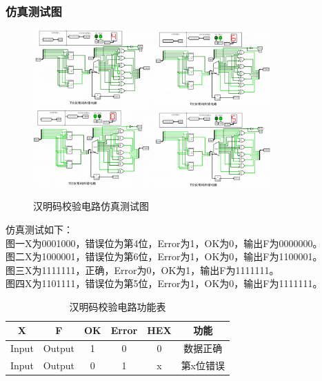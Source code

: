 \documentclass{article}
\begin{document}
    \subsubsection{仿真测试图}
    \begin{figure}[H]
    \centering
    \includegraphics[width=0.4\textwidth]{5.5.1.png}
    \includegraphics[width=0.4\textwidth]{5.5.2.png}
    \includegraphics[width=0.4\textwidth]{5.5.3.png}
    \includegraphics[width=0.4\textwidth]{5.5.4.png}
    \caption{汉明码校验电路仿真测试图}
    \end{figure}
    仿真测试如下：\\
    图一X为0001000，错误位为第4位，Error为1，OK为0，输出F为0000000。\\
    图二X为1000001，错误位为第6位，Error为1，OK为0，输出F为1100001。\\
    图三X为1111111，正确，Error为0，OK为1，输出F为1111111。\\
    图四X为1101111，错误位为第5位，Error为1，OK为0，输出F为1111111。

    \begin{table}[H]
    \centering
    \begin{tabular}{|c|c|c|c|c|c|}
        \hline
        X & F & OK & Error & HEX & 功能 \\ \hline
        Input & Output & 1 & 0 & 0 & 数据正确 \\ \hline
        Input & Output & 0 & 1 & x & 第x位错误 \\ \hline
    \end{tabular}
    \caption{汉明码校验电路功能表}
    \end{table}
\end{document}
